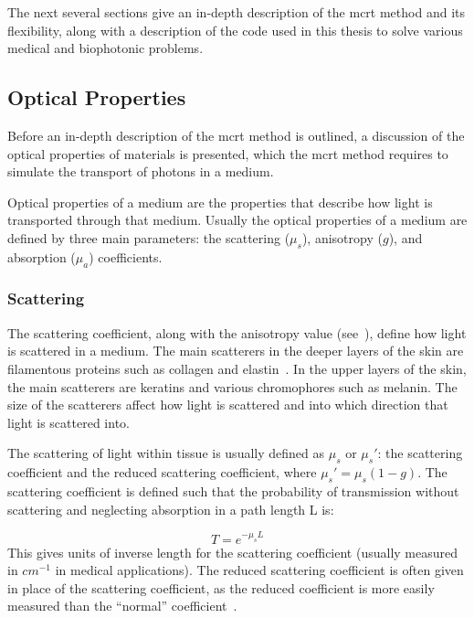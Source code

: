 The next several sections give an in-depth description of the \gls*{mcrt} method and its flexibility, along with a description of the code used in this thesis to solve various medical and biophotonic problems.

\subsection{Optical Properties}\label{sec:optprop}

Before an in-depth description of the \gls*{mcrt} method is outlined, a discussion of the optical properties of materials is presented, which the \gls*{mcrt} method requires to simulate the transport of photons in a medium.

Optical properties of a medium are the properties that describe how light is transported through that medium. Usually the optical properties of a medium are defined by three main parameters: the scattering ($\mu_s$), anisotropy ($g$), and  absorption ($\mu_a$) coefficients.

\subsubsection*{Scattering}\label{sec:scatt}

The scattering coefficient, along with the anisotropy value (see~), define how light is scattered in a medium. The main scatterers in the deeper layers of the skin are filamentous proteins such as collagen and elastin~\cite{jacques1996origins}. In the upper layers of the skin, the main scatterers are keratins and various chromophores such as melanin. 
The size of the scatterers affect how light is scattered and into which direction that light is scattered into.

\medskip

The scattering of light within tissue is usually defined as $\mu_s$ or $\mu_s'$: the scattering coefficient and the reduced scattering coefficient, where $\mu_s'=\mu_s(1-g)$. The scattering coefficient is defined such that the probability of transmission without scattering and neglecting absorption in a path length L is:

\begin{equation}
	T=e^{-\mu_sL}
\end{equation}
This gives units of inverse length for the scattering coefficient (usually measured in $cm^{-1}$ in medical applications). The reduced scattering coefficient is often given in place of the scattering coefficient, as the reduced coefficient is more easily measured than the ``normal'' coefficient~\cite{jacques2013optical}.



